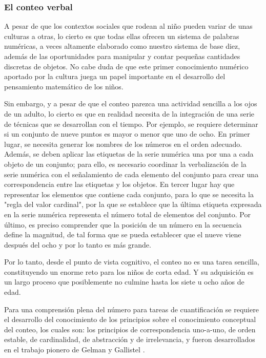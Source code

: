 \documentclass{article}
\begin{document}
\subsubsection{El conteo verbal}
A pesar de que los contextos sociales que rodean al niño pueden variar de unas culturas a otras, lo cierto es que todas ellas ofrecen un sistema de palabras numéricas, a veces altamente elaborado como nuestro sistema de base diez, además de las oportunidades para manipular y contar pequeñas cantidades discretas de objetos. No cabe duda de que este primer conocimiento numérico aportado por la cultura juega un papel importante en el desarrollo del pensamiento matemático de los niños.

Sin embargo, y a pesar de que el conteo parezca una actividad sencilla a los ojos de un adulto, lo cierto es que en realidad necesita de la integración de una serie de técnicas que se desarrollan con el tiempo. Por ejemplo, se requiere determinar si un conjunto de nueve puntos es mayor o menor que uno de ocho. En primer lugar, se necesita generar los nombres de los números en el orden adecuado. Además, se deben aplicar las etiquetas de la serie numérica una por una a cada objeto de un conjunto; para ello, es necesario coordinar la verbalización de la serie numérica con el señalamiento de cada elemento del conjunto para crear una correspondencia entre las etiquetas y los objetos. En tercer lugar hay que representar los elementos que contiene cada conjunto, para lo que se necesita la "regla del valor cardinal", por la que se establece que la última etiqueta expresada en la serie numérica representa el número total de elementos del conjunto. Por último, es preciso comprender que la posición de un número en la secuencia define la magnitud, de tal forma que se pueda establecer que el nueve viene después del ocho y por lo tanto es más grande.

Por lo tanto, desde el punto de vista cognitivo, el conteo no es una tarea sencilla, constituyendo un enorme reto para los niños de corta edad. Y su adquisición es un largo proceso que posiblemente no culmine hasta los siete u ocho años de edad.

Para una comprensión plena del número para tareas de cuantificación se requiere el desarrollo del conocimiento de los principios sobre el conocimiento conceptual del conteo, los cuales son: los principios de correspondencia uno-a-uno, de orden estable, de cardinalidad, de abstracción y de irrelevancia, y fueron desarrollados en el trabajo pionero de Gelman y Gallistel \cite{german1978child}.
\end{document}
